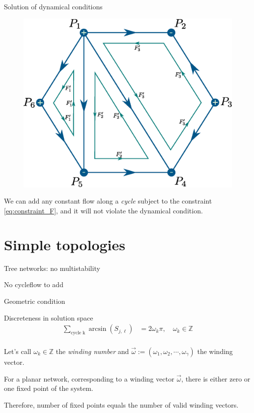 \documentclass[xcolor=x11names,compress]{beamer}
\renewcommand{\(}{\begin{columns}}
\renewcommand{\)}{\end{columns}}
\newcommand{\<}[1]{\begin{column}{#1}}
\renewcommand{\>}{\end{column}}
\begin{document}
\begin{frame}{Solution of dynamical conditions}
\begin{figure}
\begin{center}
\includegraphics[width=0.7\columnwidth]{cycle_flow}
\end{center}
\end{figure}

We can add any constant flow along a \emph{cycle} subject to the constraint 
\eqref{eq:constraint_F}, and it will not violate the dynamical condition.  
\end{frame}


\section{Simple topologies}
\begin{frame}{Tree networks: no multistability}
\begin{center}
\Large{No cycleflow to add}
\end{center}
\end{frame}



\begin{frame}{Geometric condition}
\begin{block}{Discreteness in solution space}
\begin{align*}
    \sum_{\textrm{cycle k}} \arcsin(S_{j,\ell}) & = 2 \omega_{k} \pi, \quad \omega_k\in\mathbb{Z}\\
\end{align*}
\end{block}

Let's call $\omega_k\in \mathbb{Z}$ the \emph{winding number} and $\vec{\omega}:=(\omega_{1},\omega_{2},\cdots,\omega_{\gamma})$ the 
{winding vector}.  

\begin{block}{}
\begin{theorem}
\label{thm:winding}
For a planar network, corresponding to a  winding vector $\vec{\omega}$, there is either zero or one fixed point 
of the system.   
\end{theorem}
\end{block}
Therefore, number of fixed points equals the number of valid 
winding vectors. 
\end{frame}
\end{document}
